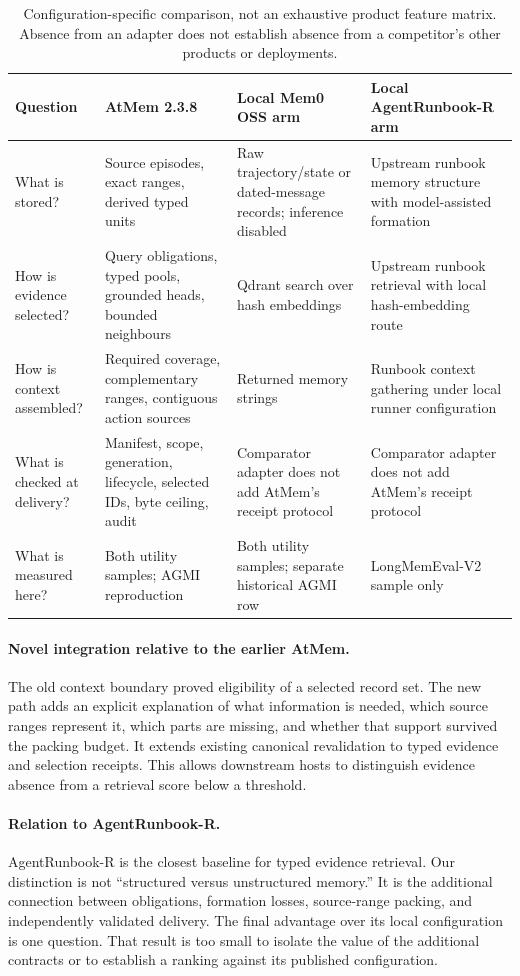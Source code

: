 \documentclass[10pt,twocolumn]{article}
\begin{document}
\begin{table}[t]
\centering\small
\begin{tabularx}{\linewidth}{p{.16\linewidth}YYY}
\toprule
Question & AtMem 2.3.8 & Local Mem0 OSS arm & Local AgentRunbook-R arm\\\midrule
What is stored? & Source episodes, exact ranges, derived typed units & Raw trajectory/state or dated-message records; inference disabled & Upstream runbook memory structure with model-assisted formation\\
How is evidence selected? & Query obligations, typed pools, grounded heads, bounded neighbours & Qdrant search over hash embeddings & Upstream runbook retrieval with local hash-embedding route\\
How is context assembled? & Required coverage, complementary ranges, contiguous action sources & Returned memory strings & Runbook context gathering under local runner configuration\\
What is checked at delivery? & Manifest, scope, generation, lifecycle, selected IDs, byte ceiling, audit & Comparator adapter does not add AtMem's receipt protocol & Comparator adapter does not add AtMem's receipt protocol\\
What is measured here? & Both utility samples; AGMI reproduction & Both utility samples; separate historical AGMI row & LongMemEval-V2 sample only\\\bottomrule
\end{tabularx}
\caption{Configuration-specific comparison, not an exhaustive product feature matrix. Absence from an adapter does not establish absence from a competitor's other products or deployments.}
\label{tab:systems}
\end{table}

\paragraph{Novel integration relative to the earlier AtMem.}
The old context boundary proved eligibility of a selected record set. The new path adds an explicit explanation of what information is needed, which source ranges represent it, which parts are missing, and whether that support survived the packing budget. It extends existing canonical revalidation to typed evidence and selection receipts. This allows downstream hosts to distinguish evidence absence from a retrieval score below a threshold.

\paragraph{Relation to AgentRunbook-R.}
AgentRunbook-R is the closest baseline for typed evidence retrieval. Our distinction is not ``structured versus unstructured memory.'' It is the additional connection between obligations, formation losses, source-range packing, and independently validated delivery. The final advantage over its local configuration is one question. That result is too small to isolate the value of the additional contracts or to establish a ranking against its published configuration.
\end{document}
